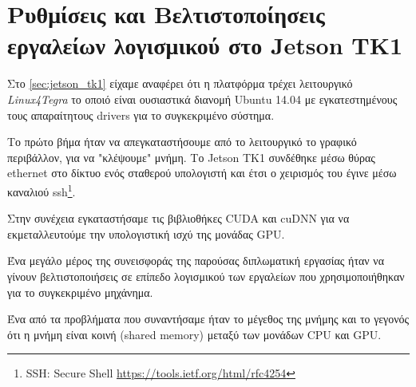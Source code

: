 \section{Ρυθμίσεις και Βελτιστοποίησεις εργαλείων λογισμικού στο Jetson TK1}

Στο \autoref{sec:jetson_tk1} είχαμε αναφέρει ότι η πλατφόρμα τρέχει
λειτουργικό \emph{Linux4Tegra} το οποιό είναι ουσιαστικά διανομή Ubuntu 14.04
με εγκατεστημένους τους απαραίτητους drivers για το συγκεκριμένο σύστημα.

Το πρώτο βήμα ήταν να απεγκαταστήσουμε από το λειτουργικό το
γραφικό περιβάλλον, για να "κλέψουμε" μνήμη. Το Jetson TK1 συνδέθηκε
μέσω θύρας ethernet στο δίκτυο ενός σταθερού υπολογιστή και έτσι ο χειρισμός
του έγινε μέσω καναλιού ssh\footnote{SSH: Secure Shell \href{https://tools.ietf.org/html/rfc4254}{https://tools.ietf.org/html/rfc4254}}.

Στην συνέχεια εγκαταστήσαμε τις βιβλιοθήκες CUDA και cuDNN για να εκμεταλλευτούμε
την υπολογιστική ισχύ της μονάδας GPU.

Ένα μεγάλο μέρος της συνεισφοράς της παρούσας διπλωματική εργασίας
ήταν να γίνουν βελτιστοποιήσεις σε επίπεδο λογισμικού των εργαλείων που χρησιμοποιήθηκαν
για το συγκεκριμένο μηχάνημα.

Ένα από τα προβλήματα που συναντήσαμε ήταν το μέγεθος της μνήμης και το γεγονός
ότι η μνήμη είναι κοινή (shared memory) μεταξύ των μονάδων CPU και GPU.



\label{sec:implementations_jetson}

